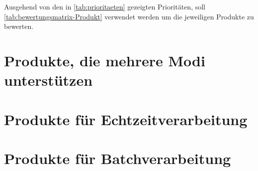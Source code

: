 

Ausgehend von den in \autoref{tab:prioritaeten} gezeigten Prioritäten, soll \autoref{tab:bewertungsmatrix-Produkt} verwendet werden um die jeweiligen Produkte zu bewerten.

\section{Produkte, die mehrere Modi unterstützen}


\section{Produkte für Echtzeitverarbeitung}\label{produkte:echtzeit}



\section{Produkte für Batchverarbeitung}




